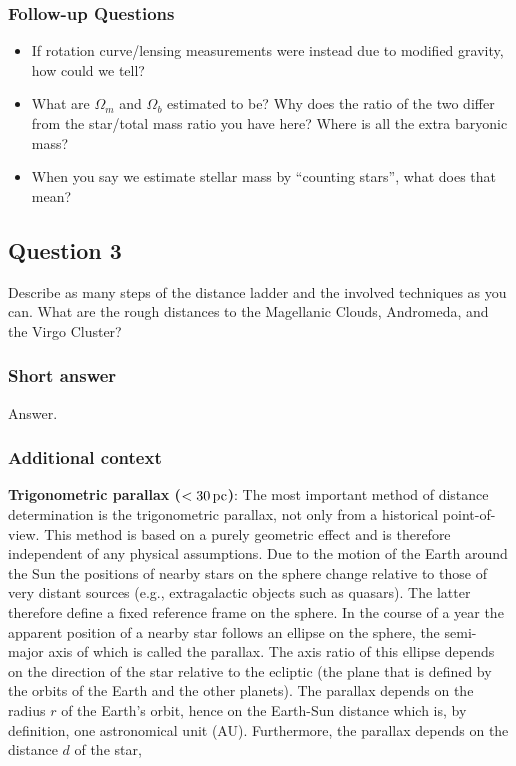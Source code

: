 \documentclass[a4paper,11pt]{article}
\begin{document}
\subsubsection{Follow-up Questions}

\begin{itemize}
    \item If rotation curve/lensing measurements were instead due to modified gravity, how could we tell?
    \item What are $\Omega_m$ and $\Omega_b$ estimated to be? Why does the ratio of the two differ from the star/total mass ratio you have here? Where is all the extra baryonic mass?
    \item When you say we estimate stellar mass by ``counting stars'', what does that mean?
\end{itemize}


\newpage
\subsection{Question 3}

Describe as many steps of the distance ladder and the involved techniques as you can. What are the rough distances to the Magellanic Clouds, Andromeda, and the Virgo Cluster?

\subsubsection{Short answer}

Answer.

\subsubsection{Additional context}

{\noindent}\textbf{Trigonometric parallax ($<30\,{\rm pc}$)}: The most important method of distance determination is the trigonometric parallax, not only from a historical point-of-view. This method is based on a purely geometric effect and is therefore independent of any physical assumptions. Due to the motion of the Earth around the Sun the positions of nearby stars on the sphere change relative to those of very distant sources (e.g., extragalactic objects such as quasars). The latter therefore define a fixed reference frame on the sphere. In the course of a year the apparent position of a nearby star follows an ellipse on the sphere, the semi-major axis of which is called the parallax. The axis ratio of this ellipse depends on the direction of the star relative to the ecliptic (the plane that is defined by the orbits of the Earth and the other planets). The parallax depends on the radius $r$ of the Earth’s orbit, hence on the Earth-Sun distance which is, by definition, one astronomical unit (AU). Furthermore, the parallax depends on the distance $d$ of the star,
\end{document}
